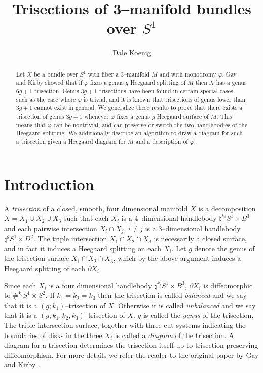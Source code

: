 \documentclass[12pt]{amsart}
\newcommand{\del}{\partial }
\theoremstyle{definition}
\theoremstyle{remark}
\begin{document}
\title{Trisections of 3--manifold bundles over $S^1$}
\author{Dale Koenig}
\date{}


\begin{abstract}
Let $X$ be a bundle over $S^1$ with fiber a 3--manifold $M$ and with monodromy $\varphi$.
Gay and Kirby showed that if $\varphi$ fixes a genus $g$ Heegaard splitting of $M$ then $X$ has a genus $6g+1$ trisection.
Genus $3g+1$ trisections have been found in certain special cases, such as the case where $\varphi$ is trivial, and it is known that trisections of genus lower than $3g+1$ cannot exist in general.
We generalize these results to prove that there exists a trisection of genus $3g+1$ whenever $\varphi$ fixes a genus $g$ Heegaard surface of $M$.
This means that $\varphi$ can be nontrivial, and can preserve or switch the two handlebodies of the Heegaard splitting.
We additionally describe an algorithm to draw a diagram for such a trisection given a Heegaard diagram for $M$ and a description of $\varphi$.
\end{abstract}

\maketitle

\section{Introduction}
A \emph{trisection} of a closed, smooth, four dimensional manifold $X$ is a decomposition $X = X_1 \cup X_2 \cup X_3$ such that each $X_i$ is a 4--dimensional handlebody $\natural^{k_i} S^1 \times B^3$ and each pairwise intersection $X_i \cap X_j$, $i \not = j$ is a 3--dimensional handlebody $\natural^g S^1 \times D^2$.
The triple intersection $X_1 \cap X_2 \cap X_3$ is necessarily a closed surface, and in fact it induces a Heegaard splitting on each $X_i$.
Let $g$ denote the genus of the trisection surface $X_1 \cap X_2 \cap X_3$, which by the above argument induces a Heegaard splitting of each $\del X_i$.


Since each $X_i$ is a four dimensional handlebody $\natural^{k_i} S^1 \times B^3$, $\del X_i$ is diffeomorphic to $\#^{k_i} S^1 \times S^2$.
If $k_1 = k_2 = k_3$ then the trisection is called \emph{balanced} and we say that it is a $(g;k_1)$--trisection of $X$.
Otherwise it is called \emph{unbalanced} and we say that it is a $(g;k_1,k_2,k_3)$--trisection of $X$.
$g$ is called the \emph{genus} of the trisection.
The triple intersection surface, together with three cut systems indicating the boundaries of disks in the three $X_i$ is called a \emph{diagram} of the trisection.
A diagram for a trisection determines the trisection itself up to trisection preserving diffeomorphism.
For more details we refer the reader to the original paper by Gay and Kirby \cite{GayKirby1}.
\end{document}

